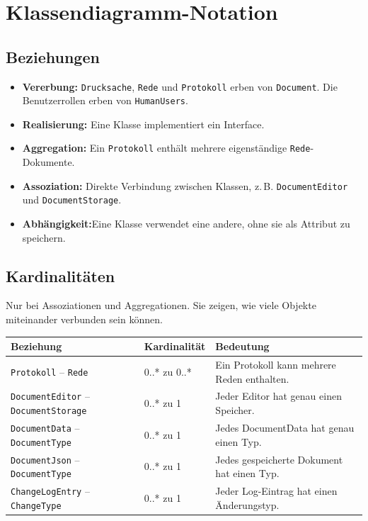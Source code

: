 \section{Klassendiagramm-Notation}


\subsection{Beziehungen}
\begin{itemize}
    \item \textbf{Vererbung:} \texttt{Drucksache}, \texttt{Rede} und \texttt{Protokoll} erben von \texttt{Document}. Die Benutzerrollen erben von \texttt{HumanUsers}.
    \item \textbf{Realisierung:}  Eine Klasse implementiert ein Interface.
    \item \textbf{Aggregation:} Ein \texttt{Protokoll} enthält mehrere eigenständige \texttt{Rede}-Dokumente.
    \item \textbf{Assoziation:} Direkte Verbindung zwischen Klassen, z.\,B. \texttt{DocumentEditor} und \texttt{DocumentStorage}.
    \item \textbf{Abhängigkeit:}Eine Klasse verwendet eine andere, ohne sie als Attribut zu speichern.
\end{itemize}

\subsection{Kardinalitäten}
Nur bei Assoziationen und Aggregationen. Sie zeigen, wie viele Objekte miteinander verbunden sein können.

\begin{center}
\begin{tabular}{|p{4.2cm}|p{2.5cm}|p{8.5cm}|}
\hline
\textbf{Beziehung} & \textbf{Kardinalität} & \textbf{Bedeutung} \\ \hline
\texttt{Protokoll} -- \texttt{Rede} & 0..* zu 0..* & Ein Protokoll kann mehrere Reden enthalten. \\ \hline
\texttt{DocumentEditor} -- \texttt{DocumentStorage} & 0..* zu 1 & Jeder Editor hat genau einen Speicher. \\ \hline
\texttt{DocumentData} -- \texttt{DocumentType} & 0..* zu 1 & Jedes DocumentData hat genau einen Typ. \\ \hline
\texttt{DocumentJson} -- \texttt{DocumentType} & 0..* zu 1 & Jedes gespeicherte Dokument hat einen Typ. \\ \hline
\texttt{ChangeLogEntry} -- \texttt{ChangeType} & 0..* zu 1 & Jeder Log-Eintrag hat einen Änderungstyp. \\ \hline
\end{tabular}
\end{center}

